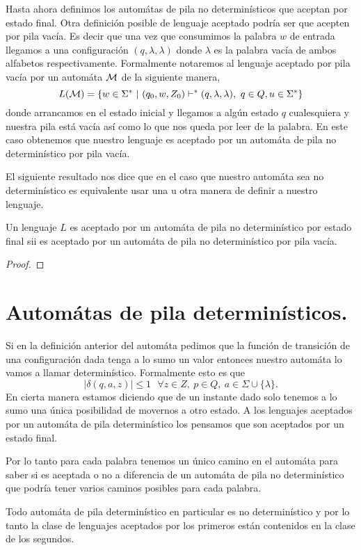 \documentclass[tesis.tex]{subfiles}
\newcommand{\APND}{automáta de pila no determinístico }
\newcommand{\APD}{automáta de pila determinístico }
\begin{document}
Hasta ahora definimos los automátas de pila no determinísticos que aceptan por estado final. Otra definición posible de lenguaje aceptado podría ser que acepten por pila vacía. Es decir que una vez que consumimos la palabra $w$ de entrada llegamos a una configuración $(q, \lambda, \lambda)$ donde $\lambda$ es la palabra vacía de ambos alfabetos respectivamente. Formalmente notaremos al lenguaje aceptado por pila vacía por un automáta $\cal M$
de la siguiente manera,
\begin{equation*}
	L({\cal M}) = \{ w \in \Sigma^* \ | \ (q_0,w,Z_0) \vdash^* (q, \lambda, \lambda), \ q \in Q, u \in \Sigma^*    \}
\end{equation*}
donde arrancamos en el estado inicial y llegamos a algún estado $q$ cualesquiera y nuestra pila está vacía así como lo que nos queda por leer de la palabra. En este caso obtenemos que nuestro lenguaje es aceptado por un automáta de pila no determinístico por pila vacía.


El siguiente resultado nos dice que en el caso que nuestro automáta sea no determinístico es equivalente usar una u otra manera de definir a nuestro lenguaje.

\medskip
\begin{teo}
Un lenguaje $L$ es aceptado por un automáta de pila no determinístico por estado final sii es aceptado por un automáta de pila no determinístico por pila vacía.
\end{teo}

\begin{proof}
\end{proof}

\section{Automátas de pila determinísticos.} Si en la definición anterior del automáta pedimos que la función de transición de una configuración dada tenga a lo sumo un valor entonces nuestro automáta lo vamos a llamar determinístico. Formalmente esto es que 
\[
|\delta(q,a, z)| \le 1 \ \ \ \forall z \in Z, \ p \in Q, \ a \in \Sigma \cup \{ \lambda \}.
\]
En cierta manera estamos diciendo que de un instante dado solo tenemos a lo sumo una única posibilidad de movernos a otro estado. A los lenguajes aceptados por un \APD los pensamos que son aceptados por un estado final.


 Por lo tanto para cada palabra tenemos un único camino en el automáta para saber si es aceptada o no a diferencia de un \APND  que podría tener varios caminos posibles para cada palabra.
\begin{obs}
	Todo \APD en particular es no determinístico y por lo tanto la clase de lenguajes aceptados por los primeros están contenidos en la clase de los segundos.
\end{obs}
\end{document}
